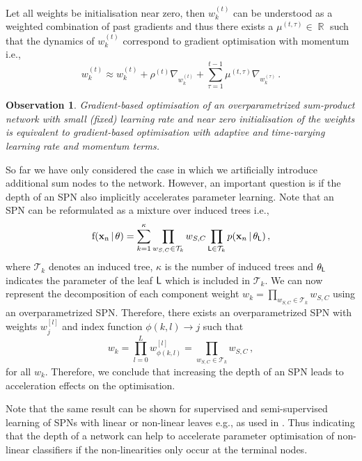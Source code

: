\documentclass{article}
\DeclareMathOperator*{\R}{\mathbb{R}}
\DeclareMathOperator*{\f}{f(\xn \,|\, \theta)}
\newcommand{\wt}{w^{(t)}_{k}}
\newtheorem{observation}{Observation}
\begin{document}
Let all weights be initialisation near zero, then $\wt$ can be understood as a weighted combination of past gradients and thus there exists a $\mu^{(t,\tau)} \in \R$ such that the dynamics of $\wt$ correspond to gradient optimisation with momentum i.e., 
\begin{equation}
  \wt \approx \wt + \rho^{(t)} \nabla_{\wt} + \sum_{\tau=1}^{t-1} \mu^{(t,\tau)} \nabla_{w^{(\tau)}_k} \, .
\end{equation}

\begin{observation}
Gradient-based optimisation of an overparametrized sum-product network with small (fixed) learning rate and near zero initialisation of the weights is equivalent to gradient-based optimisation with adaptive and time-varying learning rate and momentum terms.
\end{observation}

So far we have only considered the case in which we artificially introduce additional sum nodes to the network.
However, an important question is if the depth of an SPN also implicitly accelerates parameter learning.
Note that an SPN can be reformulated as a mixture over induced trees \cite{Zhao2016} i.e., 
\[
\f = \sum_{k=1}^{\kappa} \prod_{w_{S,C} \in \mathcal{T}_k} w_{S,C} \prod_{\Leaf \in \mathcal{T}_k} p(\xn \,|\, \theta_{\Leaf}) \, ,
\]
where $\mathcal{T}_k$ denotes an induced tree, $\kappa$ is the number of induced trees and $\theta_{\mathsf{L}}$ indicates the parameter of the leaf $\mathsf{L}$ which is included in $\mathcal{T}_k$.
We can now represent the decomposition of each component weight $w_k = \prod_{w_{S,C} \in \mathcal{T}_k} w_{S,C}$ using an overparametrized SPN.
Therefore, there exists an overparametrized SPN with weights $w^{[l]}_{j}$ and index function $\phi(k, l) \rightarrow j$ such that
\[
w_k = \prod_{l=0}^L w^{[l]}_{\phi(k, l)} = \prod_{w_{S,C} \in \mathcal{T}_k} w_{S,C} \, ,
\]
for all $w_k$.
Therefore, we conclude that increasing the depth of an SPN leads to acceleration effects on the optimisation.

Note that the same result can be shown for supervised and semi-supervised learning of SPNs with linear or non-linear leaves e.g., as used in \cite{Gens2012,Trapp2017,Peharz2018}.
Thus indicating that the depth of a network can help to accelerate parameter optimisation of non-linear classifiers if the non-linearities only occur at the terminal nodes.
\end{document}
